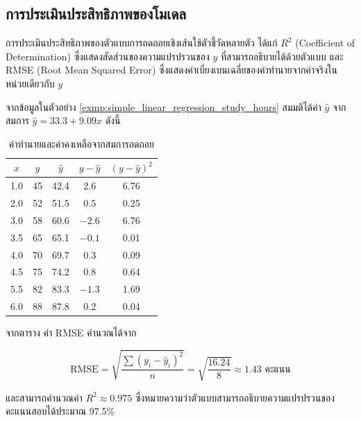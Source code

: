 \subsection{การประเมินประสิทธิภาพของโมเดล}
การประเมินประสิทธิภาพของตัวแบบการถดถอยเชิงเส้นใช้ตัวชี้วัดหลายตัว ได้แก่ $R^2$ (Coefficient of Determination) ซึ่งแสดงสัดส่วนของความแปรปรวนของ $y$ ที่สามารถอธิบายได้ด้วยตัวแบบ และ RMSE (Root Mean Squared Error) ซึ่งแสดงค่าเบี่ยงเบนเฉลี่ยของค่าทำนายจากค่าจริงในหน่วยเดียวกับ $y$

\begin{exmp}
\label{exmp:r_squared_calculation}
จากข้อมูลในตัวอย่าง \ref{exmp:simple_linear_regression_study_hours} สมมติได้ค่า $\hat{y}$ จากสมการ $\hat{y} = 33.3 + 9.09x$ ดังนี้

\begin{table}[h!]
\centering
\caption{ค่าทำนายและค่าคงเหลือจากสมการถดถอย}
\label{tab:residual_calc}
\begin{tabular}{|c|c|c|c|c|}
\hline
$x$ & $y$ & $\hat{y}$ & $y - \hat{y}$ & $(y - \hat{y})^2$ \\ \hline
1.0 & 45 & 42.4 & 2.6 & 6.76 \\ \hline
2.0 & 52 & 51.5 & 0.5 & 0.25 \\ \hline
3.0 & 58 & 60.6 & $-2.6$ & 6.76 \\ \hline
3.5 & 65 & 65.1 & $-0.1$ & 0.01 \\ \hline
4.0 & 70 & 69.7 & 0.3 & 0.09 \\ \hline
4.5 & 75 & 74.2 & 0.8 & 0.64 \\ \hline
5.5 & 82 & 83.3 & $-1.3$ & 1.69 \\ \hline
6.0 & 88 & 87.8 & 0.2 & 0.04 \\ \hline
\end{tabular}
\end{table}

จากตาราง ค่า RMSE คำนวณได้จาก

\[
\text{RMSE} = \sqrt{\frac{\sum(y_i - \hat{y}_i)^2}{n}} = \sqrt{\frac{16.24}{8}} \approx 1.43 \text{ คะแนน}
\]

และสามารถคำนวณค่า $R^2 \approx 0.975$ ซึ่งหมายความว่าตัวแบบสามารถอธิบายความแปรปรวนของคะแนนสอบได้ประมาณ 97.5\%
\end{exmp}





